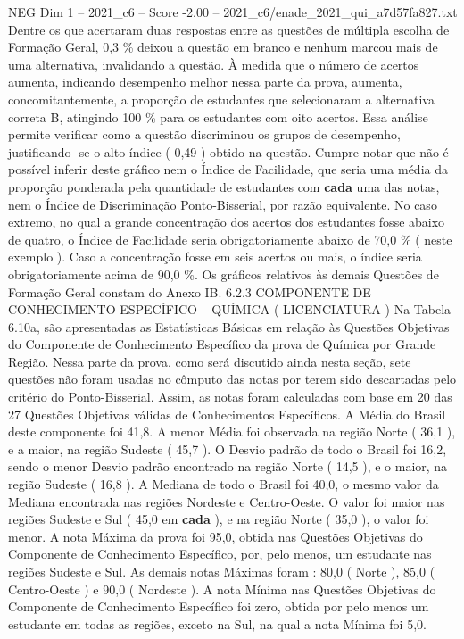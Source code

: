 \begin{textsample}{NEG Dim 1 – 2021\_c6 – Score -2.00 – 2021\_c6/enade\_2021\_qui\_a7d57fa827.txt}
Dentre os que acertaram duas respostas entre as questões de múltipla escolha de Formação Geral, 0,3 \% deixou a questão em branco e nenhum marcou mais de uma alternativa, invalidando a questão.
À medida que o número de acertos aumenta, indicando desempenho melhor nessa parte da prova, aumenta, concomitantemente, a proporção de estudantes que selecionaram a alternativa correta B, atingindo 100 \% para os estudantes com oito acertos.
Essa análise permite verificar como a questão discriminou os grupos de desempenho, justificando -se o alto índice ( 0,49 ) obtido na questão.
Cumpre notar que não é possível inferir deste gráfico nem o Índice de Facilidade, que seria uma média da proporção ponderada pela quantidade de estudantes com \textbf{cada} uma das notas, nem o Índice de Discriminação Ponto-Bisserial, por razão equivalente.
No caso extremo, no qual a grande concentração dos acertos dos estudantes fosse abaixo de quatro, o Índice de Facilidade seria obrigatoriamente abaixo de 70,0 \% ( neste exemplo ).
Caso a concentração fosse em seis acertos ou mais, o índice seria obrigatoriamente acima de 90,0 \%.
Os gráficos relativos às demais Questões de Formação Geral constam do Anexo IB. 6.2.3 COMPONENTE DE CONHECIMENTO ESPECÍFICO – QUÍMICA ( LICENCIATURA ) Na Tabela 6.10a, são apresentadas as Estatísticas Básicas em relação às Questões Objetivas do Componente de Conhecimento Específico da prova de Química por Grande Região.
Nessa parte da prova, como será discutido ainda nesta seção, sete questões não foram usadas no cômputo das notas por terem sido descartadas pelo critério do Ponto-Bisserial.
Assim, as notas foram calculadas com base em 20 das 27 Questões Objetivas válidas de Conhecimentos Específicos.
A Média do Brasil deste componente foi 41,8.
A menor Média foi observada na região Norte ( 36,1 ), e a maior, na região Sudeste ( 45,7 ).
O Desvio padrão de todo o Brasil foi 16,2, sendo o menor Desvio padrão encontrado na região Norte ( 14,5 ), e o maior, na região Sudeste ( 16,8 ).
A Mediana de todo o Brasil foi 40,0, o mesmo valor da Mediana encontrada nas regiões Nordeste e Centro-Oeste.
O valor foi maior nas regiões Sudeste e Sul ( 45,0 em \textbf{cada} ), e na região Norte ( 35,0 ), o valor foi menor.
A nota Máxima da prova foi 95,0, obtida nas Questões Objetivas do Componente de Conhecimento Específico, por, pelo menos, um estudante nas regiões Sudeste e Sul.
As demais notas Máximas foram : 80,0 ( Norte ), 85,0 ( Centro-Oeste ) e 90,0 ( Nordeste ).
A nota Mínima nas Questões Objetivas do Componente de Conhecimento Específico foi zero, obtida por pelo menos um estudante em todas as regiões, exceto na Sul, na qual a nota Mínima foi 5,0.

\end{textsample}
